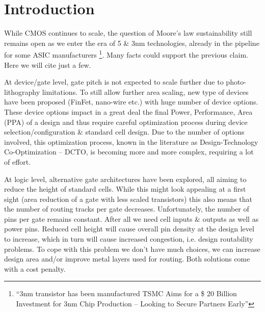 \documentclass[conference]{IEEEtran}
\begin{document}

\section{Introduction}
While CMOS continues to scale, the question of Moore's law sustainability still remains open as we enter the era of 5 \& 3nm technologies, already in the pipeline for some ASIC manufacturers \footnote{``3nm transistor has been manufactured TSMC Aims for a \$ 20 Billion Investment for 3nm Chip Production – Looking to Secure Partners Early''}. Many facts could support the previous claim. Here we will cite just a few. 

At device/gate level, gate pitch is not expected to scale further due to photo-lithography limitations. To still allow further area scaling, new type of devices have been proposed (FinFet, nano-wire etc.) with huge number of device options. These device options impact in a great deal the final Power, Performance, Area (PPA) of a design and thus require careful optimization process during device selection/configuration \& standard cell design. Due to the number of options involved, this optimization process, known in the literature as Design-Technology Co-Optimization -- DCTO, is becoming more and more complex, requiring a lot of effort.

At logic level, alternative gate architectures have been explored, all aiming to reduce the height of standard cells. While this might look appealing at a first sight (area reduction of a gate with less scaled transistors) this also means that the number of routing tracks per gate decreases. Unfortunately, the number of pins per gate remains constant. After all we need cell inputs \& outputs as well as power pins. Reduced cell height will cause overall pin density at the design level to increase, which in turn will cause increased congestion, i.e. design routability problems. To cope with this problem we don't have much choices, we can increase design area and/or improve metal layers used for routing. Both solutions come with a cost penalty. 
\end{document}
